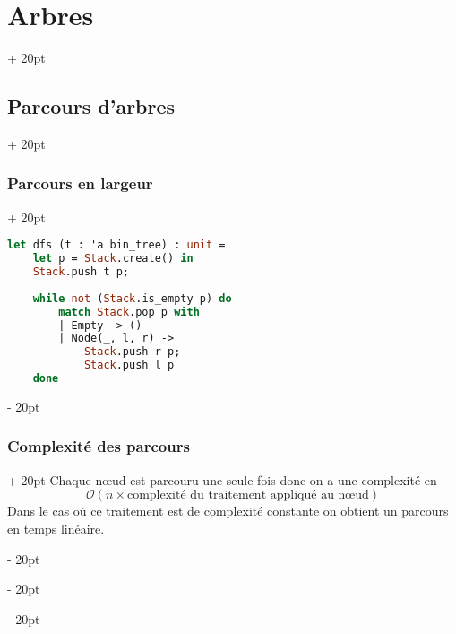 \documentclass[a4paper, 12pt, twoside]{article}
\newcommand{\ind}[1][20pt]{\advance\leftskip + #1}
\newcommand{\deind}[1][20pt]{\advance\leftskip - #1}
\newenvironment{indt}[2][20pt]{#2 \par \ind[#1]}{\par \deind} %
\begin{document}
\begin{indt}{\section{Arbres}}
\begin{indt}{\subsection{Parcours d'arbres}}
\begin{indt}{\subsubsection{Parcours en largeur}}
                \begin{lstlisting}[language=Caml, xleftmargin=80pt]
let dfs (t : 'a bin_tree) : unit =
    let p = Stack.create() in
    Stack.push t p;
    
    while not (Stack.is_empty p) do
        match Stack.pop p with
        | Empty -> ()
        | Node(_, l, r) ->
            Stack.push r p;
            Stack.push l p
    done\end{lstlisting}
            \end{indt}
            
            \vspace{12pt}
            
            \begin{indt}{\subsubsection{Complexité des parcours}}
                Chaque n\oe ud est parcouru une seule fois donc on a une complexité en
                    \[ \mathcal O(n \times \text{complexité du traitement appliqué au n\oe ud}) \]
                Dans le cas où ce traitement est de complexité constante on obtient un parcours en temps linéaire.
            \end{indt}
        \end{indt}
        
    \end{indt}
    
    \vspace{12pt}
    
\end{document}
